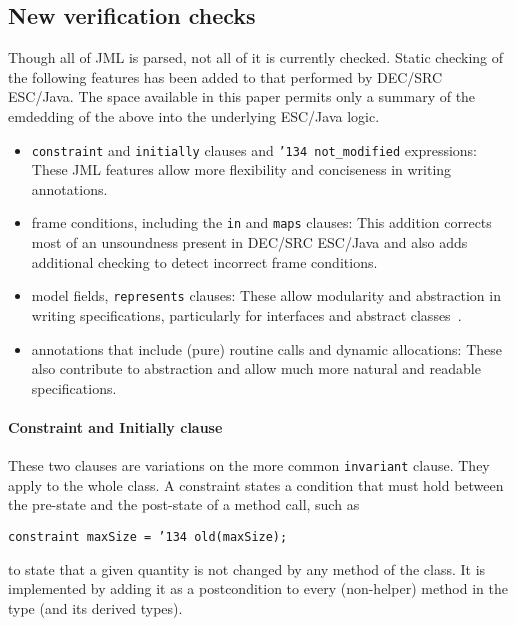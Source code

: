 \documentclass{sig-alternate}
\begin{document}

\subsection{New verification checks}
Though all of JML is parsed, not all of it is currently checked.
Static checking of the following features has been added to that performed by
DEC/SRC ESC/Java.  The space available in this paper permits only a summary of the emdedding of the above into the underlying ESC/Java logic.  
\setlength{\partopsep}{0in}\setlength{\parskip}{0in}\setlength{\itemsep}{0in}\setlength{\topsep}{0in}
\begin{itemize}
\setlength{\partopsep}{0in}\setlength{\parskip}{0in}\setlength{\itemsep}{0in}\setlength{\topsep}{0in}
\item \texttt{constraint} and \texttt{initially} clauses and \texttt{\char'134 not\_modified} expressions: These JML features allow more flexibility and conciseness in writing annotations.
\item frame conditions, including the \texttt{in} and \texttt{maps} clauses:  This addition corrects
most of an unsoundness present in DEC/SRC ESC/Java and also adds additional checking to detect
incorrect frame conditions.
\item model fields, \texttt{represents} clauses: These allow modularity and abstraction in
writing specifications, particularly for interfaces and abstract classes~\cite{Cheon-etal03}.
\item annotations that include (pure) routine calls and dynamic allocations: These also contribute
to abstraction and allow much more natural and readable specifications.
\end{itemize}

\paragraph*{Constraint and Initially clause}
These two clauses are variations on the more common \texttt{invariant} clause.  They apply to the whole class.  A constraint states a condition that must hold between the pre-state and the post-state of a method call, such as
\begin{center}
\texttt{constraint maxSize = \char'134 old(maxSize); }
\end{center}
to state that a given quantity is not changed by any method of the class.  It is implemented by 
adding it as a postcondition to every (non-helper) method in the type (and its derived types).
\end{document}
